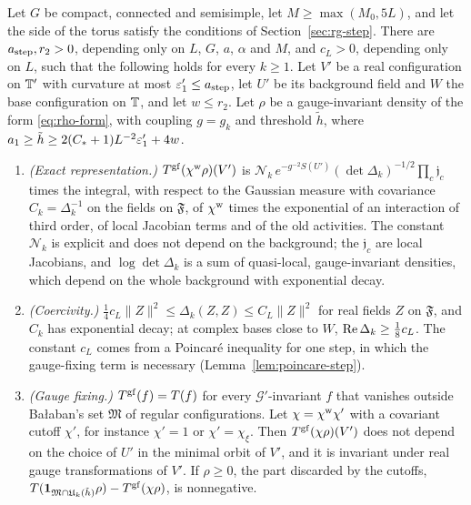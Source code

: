 \begin{maintheorem}\label{thm:K}
Let $G$ be compact, connected and semisimple, let $M\ge\max(M_0,5L)$, and let the side of the torus satisfy the conditions of Section~\ref{sec:rg-step}. There are $a_{\rm step},r_2>0$, depending only on $L$, $G$, $a$, $\alpha$ and $M$, and $c_L>0$, depending only on $L$, such that the following holds for every $k\ge1$. Let $V'$ be a real configuration on $\mathbb T'$ with curvature at most $\varepsilon'_1\le a_{\rm step}$, let $U'$ be its background field and $W$ the base configuration on $\mathbb T$, and let $w\le r_2$. Let $\rho$ be a gauge-invariant density of the form \eqref{eq:rho-form}, with coupling $g=g_k$ and threshold $\tilde h$, where $a_1\ge\tilde h\ge2(C_*+1)L^{-2}\varepsilon'_1+4w$.
\begin{enumerate}[label=(\roman*)]
\item \emph{(Exact representation.)} $T^{\rm gf}(\chi^{\rm w}\rho)(V')$ is $\mathcal N_k\,e^{-g^{-2}S(U')}(\det\Delta_k)^{-1/2}\prod_c\mathfrak j_c$ times the integral, with respect to the Gaussian measure with covariance $C_k=\Delta_k^{-1}$ on the fields on $\mathfrak F$, of $\chi^{\rm w}$ times the exponential of an interaction of third order, of local Jacobian terms and of the old activities. The constant $\mathcal N_k$ is explicit and does not depend on the background; the $\mathfrak j_c$ are local Jacobians, and $\log\det\Delta_k$ is a sum of quasi-local, gauge-invariant densities, which depend on the whole background with exponential decay.
\item \emph{(Coercivity.)} $\frac14c_L\|Z\|^2\le\Delta_k(Z,Z)\le C_L\|Z\|^2$ for real fields $Z$ on $\mathfrak F$, and $C_k$ has exponential decay; at complex bases close to $W$, $\operatorname{Re}\Delta_k\ge\frac18c_L$. The constant $c_L$ comes from a Poincar\'e inequality for one step, in which the gauge-fixing term is necessary (Lemma~\ref{lem:poincare-step}).
\item \emph{(Gauge fixing.)} $T^{\rm gf}(f)=T(f)$ for every $\mathcal G'$-invariant $f$ that vanishes outside Ba\l aban's set $\mathfrak M$ of regular configurations. Let $\chi=\chi^{\rm w}\chi'$ with a covariant cutoff $\chi'$, for instance $\chi'=1$ or $\chi'=\chi_\xi$. Then $T^{\rm gf}(\chi\rho)(V')$ does not depend on the choice of $U'$ in the minimal orbit of $V'$, and it is invariant under real gauge transformations of $V'$. If $\rho\ge0$, the part discarded by the cutoffs, $T(\mathbf 1_{\mathfrak M\cap\mathfrak U_k(\tilde h)}\rho)-T^{\rm gf}(\chi\rho)$, is nonnegative.

\end{enumerate}
\end{maintheorem}
